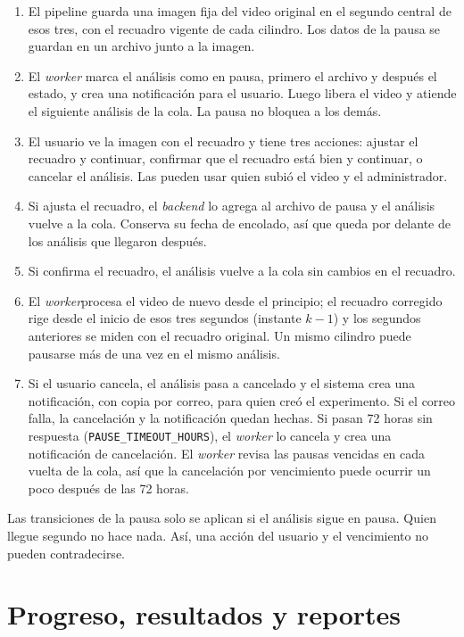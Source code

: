 \begin{enumerate}
  \item El pipeline guarda una imagen fija del video original en el segundo central de esos tres, con el
  recuadro vigente de cada cilindro. Los datos de la pausa se guardan en un archivo junto a la imagen.
  \item El \textit{worker} marca el análisis como en pausa, primero el archivo y después el estado, y crea una
  notificación para el usuario. Luego libera el video y atiende el siguiente análisis de la cola. La pausa no
  bloquea a los demás.
  \item El usuario ve la imagen con el recuadro y tiene tres acciones: ajustar el recuadro y continuar,
  confirmar que el recuadro está bien y continuar, o cancelar el análisis. Las pueden usar quien subió el
  video y el administrador.
  \item Si ajusta el recuadro, el \textit{backend} lo agrega al archivo de pausa y el análisis vuelve a la cola.
  Conserva su fecha de encolado, así que queda por delante de los análisis que llegaron después.
  \item Si confirma el recuadro, el análisis vuelve a la cola sin cambios en el recuadro.
  \item El \textit{worker}procesa el video de nuevo desde el principio; el recuadro corregido rige desde el inicio de esos tres segundos
  (instante $k-1$) y los segundos anteriores se miden con el recuadro original.
  Un mismo cilindro puede pausarse más de una vez en el mismo análisis.
  \item Si el usuario cancela, el análisis pasa a cancelado y el sistema crea una notificación, con copia por correo, para quien creó el experimento. Si el correo falla, la cancelación y la notificación quedan hechas. Si pasan 72 horas sin respuesta
  (\texttt{PAUSE\_TIMEOUT\_HOURS}), el \textit{worker} lo cancela y crea una notificación de cancelación. El
  \textit{worker} revisa las pausas vencidas en cada vuelta de la cola, así que la cancelación por vencimiento
  puede ocurrir un poco después de las 72 horas.
\end{enumerate}

Las transiciones de la pausa solo se aplican si el análisis sigue en pausa. Quien llegue segundo no hace nada.
Así, una acción del usuario y el vencimiento no pueden contradecirse.

\section{Progreso, resultados y reportes}

